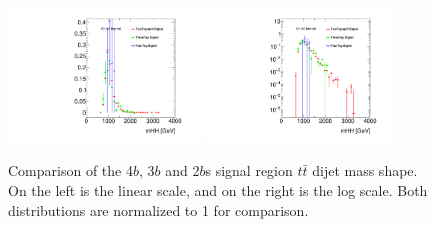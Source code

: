 \begin{figure}[htbp!]
\begin{center}
\includegraphics[angle=270, width=0.45\textwidth]{figures/boosted/Other/ttbar_compare_mHH_l.pdf}
\includegraphics[angle=270, width=0.45\textwidth]{figures/boosted/Other/ttbar_compare_mHH_l_1.pdf}
\caption{Comparison of the 4$b$, 3$b$ and 2$b$s signal region $t\bar{t}$ dijet mass shape. On the left is the linear scale, and on the right is the log scale. Both distributions are normalized to 1 for comparison.}
\label{fig:signal-region-ttbar-compare}
\end{center}
\end{figure}


